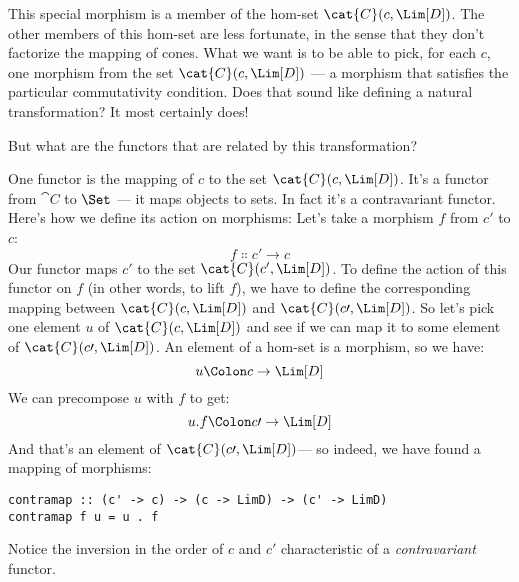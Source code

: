 This special morphism is a member of the hom-set $\cat{C}(c, \Lim[D])$.
The other members of this hom-set are less fortunate, in the sense that
they don't factorize the mapping of cones. What we want is to be able to
pick, for each $c$, one morphism from the set
$\cat{C}(c, \Lim[D])$ --- a morphism that satisfies the particular
commutativity condition. Does that sound like defining a natural
transformation? It most certainly does!

But what are the functors that are related by this transformation?

One functor is the mapping of $c$ to the set
$\cat{C}(c, \Lim[D])$. It's a functor from $\cat{C}$ to $\Set$ ---
it maps objects to sets. In fact it's a contravariant functor. Here's
how we define its action on morphisms: Let's take a morphism $f$
from $c\prime$ to $c$:
\[f \Colon c' \to c\]
Our functor maps $c'$ to the set
$\cat{C}(c', \Lim[D])$. To define the action of this functor on
$f$ (in other words, to lift $f$), we have to define the
corresponding mapping between $\cat{C}(c, \Lim[D])$ and
$\cat{C}(c\prime, \Lim[D])$. So let's pick one element $u$ of
$\cat{C}(c, \Lim[D])$ and see if we can map it to some element of
$\cat{C}(c\prime, \Lim[D])$. An element of a hom-set is a morphism, so
we have:
\[u \Colon c \to \Lim[D]\]
We can precompose $u$ with $f$ to get:
\[u . f \Colon c\prime \to \Lim[D]\]
And that's an element of $\cat{C}(c\prime, \Lim[D])$--- so indeed, we
have found a mapping of morphisms:

\begin{Verbatim}
contramap :: (c' -> c) -> (c -> LimD) -> (c' -> LimD) 
contramap f u = u . f
\end{Verbatim}

Notice the inversion in the order of $c$ and $c\prime$
characteristic of a \emph{contravariant} functor.

\begin{figure}[H]
\centering
{}
\end{figure}

